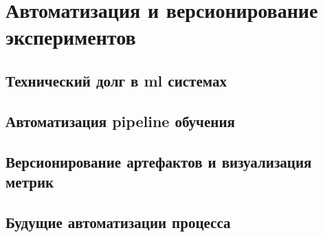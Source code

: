 
\chapter{Автоматизация и версионирование экспериментов}
\section{Технический долг в \acrshort{ml} системах}
\section{Автоматизация \gls{pipeline} обучения} \section{Версионирование артефактов и визуализация метрик}
\section{Будущие автоматизации процесса}
